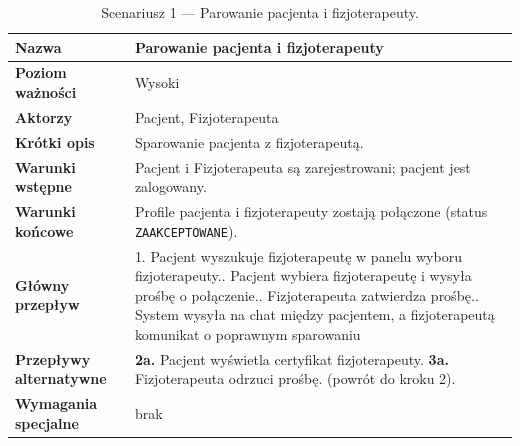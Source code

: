 \documentclass[11pt,a4paper]{article}
\begin{document}
\begin{table}[ht]
\small
\renewcommand{\arraystretch}{1.2}
\begin{tabularx}{\textwidth}{|>{\bfseries}p{}|Y|}
\hline
Nazwa & Parowanie pacjenta i fizjoterapeuty \\ \hline
Poziom ważności & Wysoki \\ \hline
Aktorzy & Pacjent, Fizjoterapeuta \\ \hline
Krótki opis & Sparowanie pacjenta z fizjoterapeutą. \\ \hline
Warunki wstępne & Pacjent i Fizjoterapeuta są zarejestrowani; pacjent jest zalogowany. \\ \hline
Warunki końcowe & Profile pacjenta i fizjoterapeuty zostają połączone (status \texttt{ZAAKCEPTOWANE}). \\ \hline
Główny przepływ & 1. Pacjent wyszukuje fizjoterapeutę w panelu wyboru fizjoterapeuty.. Pacjent wybiera fizjoterapeutę i wysyła prośbę o połączenie.. Fizjoterapeuta zatwierdza prośbę.. System wysyła na chat między pacjentem, a fizjoterapeutą komunikat o poprawnym sparowaniu \\ \hline
Przepływy alternatywne & \textbf{2a.} Pacjent wyświetla certyfikat fizjoterapeuty. \newline \textbf{3a.} Fizjoterapeuta odrzuci prośbę. (powrót do kroku 2). \\ \hline
Wymagania specjalne & brak \\ \hline
\end{tabularx}
\caption{Scenariusz 1 — Parowanie pacjenta i fizjoterapeuty.}
\end{table}
\FloatBarrier
\end{document}
